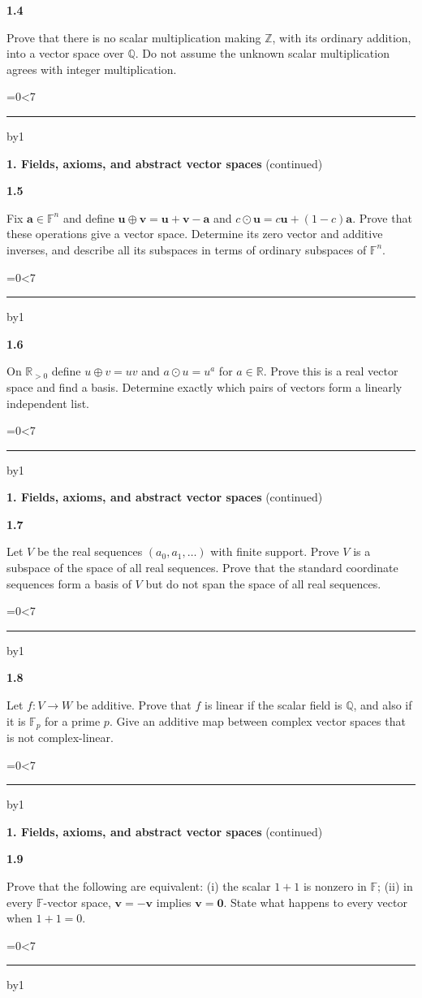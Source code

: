 \documentclass[11pt,letterpaper]{article}
\newcommand{\topicshort}{Problem collection}
\newcommand{\F}{\mathbb F}\newcommand{\R}{\mathbb R}\newcommand{\Q}{\mathbb Q}\newcommand{\C}{\mathbb C}\newcommand{\Z}{\mathbb Z}
\newcommand{\ruled}[1]{\par\begingroup\parskip=0pt\baselineskip=17pt\count255=0\loop\ifnum\count255<#1\noindent\textcolor{black!17}{\rule{\linewidth}{.25pt}}\par\advance\count255 by1\repeat\endgroup}
\newcommand{\problem}[4]{\noindent\begin{minipage}[t][3.48in][t]{\linewidth}\textbf{\color{navy}#1}\quad{\small\sffamily\color{teal}#2#3}\par #4\par\vfill\ruled{7}\end{minipage}}
\begin{document}
\par\vspace{14pt}
\problem{1.4}{M}{}{Prove that there is no scalar multiplication making $\Z$, with its ordinary addition, into a vector space over $\Q$. Do not assume the unknown scalar multiplication agrees with integer multiplication.}
\newpage
\renewcommand{\topicshort}{Axioms and abstraction}
{\large\bfseries\color{navy}1. Fields, axioms, and abstract vector spaces} {\small(continued)}\par\vspace{9pt}
\problem{1.5}{M}{}{Fix $\mathbf a\in\F^n$ and define $\mathbf u\oplus\mathbf v=\mathbf u+\mathbf v-\mathbf a$ and $c\odot\mathbf u=c\mathbf u+(1-c)\mathbf a$. Prove that these operations give a vector space. Determine its zero vector and additive inverses, and describe all its subspaces in terms of ordinary subspaces of $\F^n$.}
\par\vspace{14pt}
\problem{1.6}{M}{}{On $\R_{>0}$ define $u\oplus v=uv$ and $a\odot u=u^a$ for $a\in\R$. Prove this is a real vector space and find a basis. Determine exactly which pairs of vectors form a linearly independent list.}
\newpage
\renewcommand{\topicshort}{Axioms and abstraction}
{\large\bfseries\color{navy}1. Fields, axioms, and abstract vector spaces} {\small(continued)}\par\vspace{9pt}
\problem{1.7}{M}{}{Let $V$ be the real sequences $(a_0,a_1,\ldots)$ with finite support. Prove $V$ is a subspace of the space of all real sequences. Prove that the standard coordinate sequences form a basis of $V$ but do not span the space of all real sequences.}
\par\vspace{14pt}
\problem{1.8}{M}{}{Let $f:V\to W$ be additive. Prove that $f$ is linear if the scalar field is $\Q$, and also if it is $\F_p$ for a prime $p$. Give an additive map between complex vector spaces that is not complex-linear.}
\newpage
\renewcommand{\topicshort}{Axioms and abstraction}
{\large\bfseries\color{navy}1. Fields, axioms, and abstract vector spaces} {\small(continued)}\par\vspace{9pt}
\problem{1.9}{M}{}{Prove that the following are equivalent: (i) the scalar $1+1$ is nonzero in $\F$; (ii) in every $\F$-vector space, $\mathbf v=-\mathbf v$ implies $\mathbf v=\mathbf0$. State what happens to every vector when $1+1=0$.}
\par\vspace{14pt}
\end{document}
